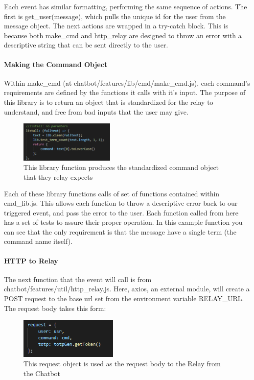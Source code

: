 \documentclass[onecolumn, draftclsnofoot,10pt, compsoc]{IEEEtran}
\begin{document}
    Each event has similar formatting, performing the same sequence of actions.
    The first is get\_user(message), which pulls the unique id for the user from the message object.
    The next actions are wrapped in a try-catch block.
    This is because both make\_cmd and http\_relay are designed to throw an error with a descriptive string that can be sent directly to the user.

    \paragraph{Making the Command Object}
    Within make\_cmd (at chatbot/features/lib/cmd/make\_cmd.js), each command's requirements are defined by the functions it calls with it's input.
    The purpose of this library is to return an object that is standardized for the relay to understand, and free from bad inputs that the user may give.
    
    \begin{figure}[ht]
        \centering
        \includegraphics[height=2cm]{code3.png}
        \caption[Make\_Cmd for listall]{This library function produces the standardized command object that they relay expects}
        \label{fig:Make_Cmd For listall}
    \end{figure}

    Each of these library functions calls of set of functions contained within cmd\_lib.js.
    This allows each function to throw a descriptive error back to our triggered event, and pass the error to the user.
    Each function called from here has a set of tests to assure their proper operation.
    In this example function you can see that the only requirement is that the message have a single term (the command name itself).
    
    \paragraph{HTTP to Relay}
    The next function that the event will call is from chatbot/features/util/http\_relay.js.
    Here, axios, an external module, will create a POST request to the base url set from the environment variable RELAY\_URL.
    The request body takes this form:
    
    \begin{figure}[ht]
        \centering
        \includegraphics[height=2cm]{code4.png}
        \caption[Request Body to Relay]{This request object is used as the request body to the Relay from the Chatbot}
        \label{fig:Request Body to Relay}
    \end{figure}
\end{document}
